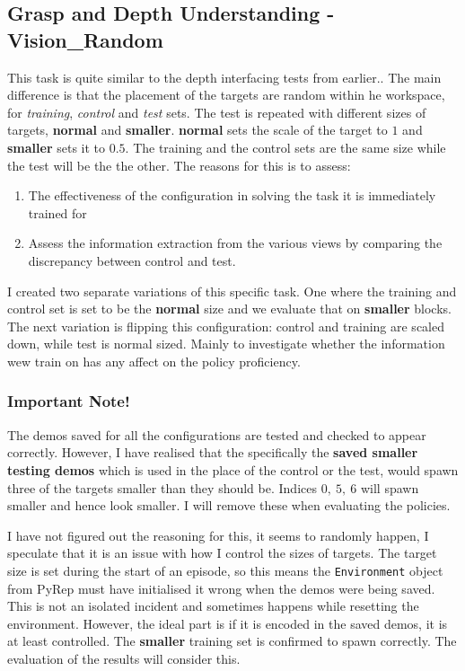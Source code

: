 \subsection{Grasp and Depth Understanding - \textbf{Vision\_Random}}
This task is quite similar to the depth interfacing tests from earlier.. The main difference is that the placement of the targets are random within he workspace, for \emph{training}, \emph{control} and \emph{test} sets. The test is repeated with different sizes of targets, \textbf{normal} and \textbf{smaller}. \textbf{normal} sets the scale of the target to $1$ and \textbf{smaller} sets it to $0.5$. The training and the control sets are the same size while the test will be the the other. The reasons for this is to assess:
\begin{enumerate}
  \item The effectiveness of the configuration in solving the task it is immediately trained for
  \item Assess the information extraction from the various views by comparing the discrepancy between control and test.
\end{enumerate}
I created two separate variations of this specific task. One where the training and control set is set to be the \textbf{normal} size and we evaluate that on \textbf{smaller} blocks. The next variation is flipping this configuration: control and training are scaled down, while test is normal sized. Mainly to investigate whether the information wew train on has any affect on the policy proficiency.

\subsubsection{Important Note!}
The demos saved for all the configurations are tested and checked to appear correctly. However, I have realised that the specifically the \textbf{saved smaller testing demos} which is used in the place of the control or the test, would spawn three of the targets smaller than they should be. Indices  \(0, ~5, ~6\)  will spawn smaller and hence look smaller. I will remove these when evaluating the policies.

I have not figured out the reasoning for this, it seems to randomly happen, I speculate that it is an issue with how I control the sizes of targets. The target size is set during the start of an episode, so this means the \verb|Environment| object from PyRep must have initialised it wrong when the demos were being saved. This is not an isolated incident and sometimes happens while resetting the environment. However, the ideal part is if it is encoded in the saved demos, it is at least controlled. The \textbf{smaller} training set is confirmed to spawn correctly. The evaluation of the results will consider this.

